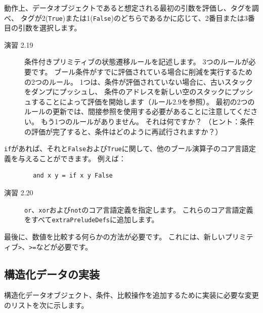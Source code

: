 \documentclass{jbook}
\begin{document}
動作上、データオブジェクトであると想定される最初の引数を評価し、タグを調べ、
タグが2(\texttt{True})または1(\texttt{False})のどちらであるかに応じて、2番目または3番目の引数を選択します。

\begin{description}
	\item[演習 2.19] 条件付きプリミティブの状態遷移ルールを記述します。
		3つのルールが必要です。
		ブール条件がすでに評価されている場合に削減を実行するための2つのルール。
		1つは、条件が評価されていない場合に、古いスタックをダンプにプッシュし、
		条件のアドレスを新しい空のスタックにプッシュすることによって評価を開始します（ルール2.9を参照）。
		最初の2つのルールの更新では、間接参照を使用する必要があることに注意してください。
		もう1つのルールがありません。
		それは何ですか？
		（ヒント：条件の評価が完了すると、条件はどのように再試行されますか？）
\end{description}

\texttt{if}があれば、それと\texttt{False}および\texttt{True}に関して、他のブール演算子のコア言語定義を与えることができます。
例えば：

\begin{verbatim}
        and x y = if x y False
\end{verbatim}

\begin{description}
	\item[演習 2.20] \texttt{or}、\texttt{xor}および\texttt{not}のコア言語定義を指定します。
		これらのコア言語定義をすべて\texttt{extraPreludeDefs}に追加します。
\end{description}

最後に、数値を比較する何らかの方法が必要です。
これには、新しいプリミティブ\texttt{>}、\texttt{>=}などが必要です。

\subsection{構造化データの実装}

構造化データオブジェクト、条件、比較操作を追加するために実装に必要な変更のリストを次に示します。
\end{document}
